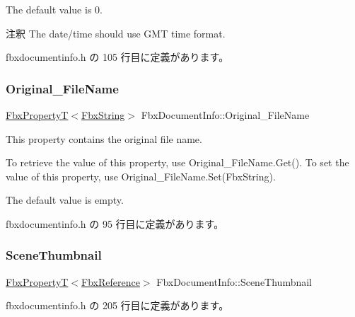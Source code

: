 The default value is 0. \begin{DoxyRemark}{注釈}
The date/time should use G\+MT time format. 
\end{DoxyRemark}


 fbxdocumentinfo.\+h の 105 行目に定義があります。

\mbox{\label{class_fbx_document_info_aa694d414acff41e98cd5f130c7091873}} 
\subsubsection{\texorpdfstring{Original\+\_\+\+File\+Name}{Original\_FileName}}
{\footnotesize\ttfamily \hyperlink{class_fbx_property_t}{Fbx\+PropertyT}$<$\hyperlink{class_fbx_string}{Fbx\+String}$>$ Fbx\+Document\+Info\+::\+Original\+\_\+\+File\+Name}

This property contains the original file name.

To retrieve the value of this property, use Original\+\_\+\+File\+Name.\+Get(). To set the value of this property, use Original\+\_\+\+File\+Name.\+Set(\+Fbx\+String).

The default value is empty. 

 fbxdocumentinfo.\+h の 95 行目に定義があります。

\mbox{\label{class_fbx_document_info_ab8e6240d40fbc0aa51f72aca4f3b9042}} 
\subsubsection{\texorpdfstring{Scene\+Thumbnail}{SceneThumbnail}}
{\footnotesize\ttfamily \hyperlink{class_fbx_property_t}{Fbx\+PropertyT}$<$\hyperlink{fbxtypes_8h_a44df6a2eec915cf27cd481e5c5e48a24}{Fbx\+Reference}$>$ Fbx\+Document\+Info\+::\+Scene\+Thumbnail\hspace{0.3cm}{\ttfamily [protected]}}



 fbxdocumentinfo.\+h の 205 行目に定義があります。

\mbox{\label{class_fbx_document_info_a074e6706550f89bcef9152030a522f11}} 
